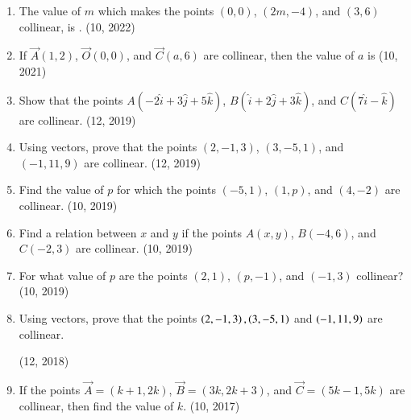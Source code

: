 \begin{enumerate}[label=\thesubsection.\arabic*, ref=\thesubsection.\theenumi]
    \item The value of $m$ which makes the points $(0,0)$, $(2m, -4)$, and $(3,6)$ collinear, is \underline{\hspace{1cm}}.
    \hfill (10, 2022)
		\item If $\vec{A}(1, 2)$, $\vec{O}(0, 0)$, and $\vec{C}(a, 6)$ are collinear, then the value of $a$ is
		\hfill (10, 2021)
	\item Show that the points $A(-2\hat{i} + 3\hat{j} + 5\hat{k})$, $B(\hat{i} + 2\hat{j} + 3\hat{k})$, and $C(7\hat{i} - \hat{k})$ are collinear. \hfill (12, 2019)
	\item Using vectors, prove that the points $(2, -1, 3)$, $(3, -5, 1)$, and $(-1, 11, 9)$ are collinear. \hfill (12, 2019)
\item Find the value of $p$ for which the points $(-5, 1)$, $(1, p)$, and $(4, -2)$ are collinear. \hfill (10, 2019)
\item Find a relation between $x$ and $y$ if the points $A(x, y)$, $B(-4, 6)$, and $C(-2, 3)$ are collinear. \hfill (10, 2019)
\item For what value of $p$ are the points $(2, 1)$, $(p, -1)$, and $(-1, 3)$ collinear? \hfill (10, 2019)
\item Using vectors, prove that the points $\left(2,-1,3\right),\left(3,-5,1\right)$ and $\left(-1,11,9\right)$ are collinear.

\hfill (12, 2018) 
\item If the points $\vec{A} = (k+1, 2k)$, $\vec{B} = (3k, 2k + 3)$, and $\vec{C} = (5k-1, 5k)$ are collinear, then find the value of $k$. \hfill (10, 2017)
\end{enumerate}
